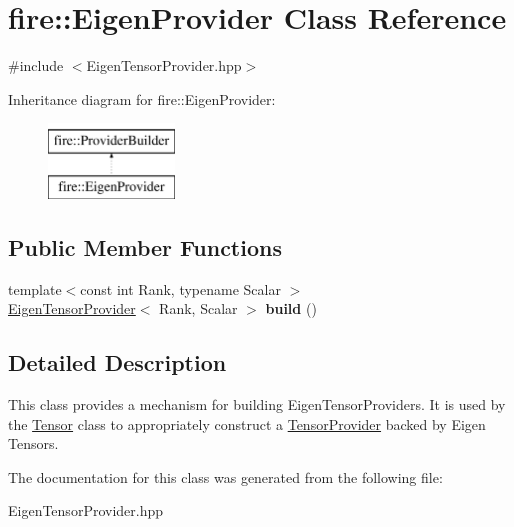 \hypertarget{a00834}{}\section{fire\+:\+:Eigen\+Provider Class Reference}
\label{a00834}


{\ttfamily \#include $<$Eigen\+Tensor\+Provider.\+hpp$>$}

Inheritance diagram for fire\+:\+:Eigen\+Provider\+:\begin{figure}[H]
\begin{center}
\leavevmode
\includegraphics[height=2.000000cm]{a00834}
\end{center}
\end{figure}
\subsection*{Public Member Functions}
\begin{DoxyCompactItemize}
\item 
\mbox{\label{a00834_ab9bfc7a0004ea10d57442f495c468b2e}} 
{\footnotesize template$<$const int Rank, typename Scalar $>$ }\\\hyperlink{a00830}{Eigen\+Tensor\+Provider}$<$ Rank, Scalar $>$ {\bfseries build} ()
\end{DoxyCompactItemize}


\subsection{Detailed Description}
This class provides a mechanism for building Eigen\+Tensor\+Providers. It is used by the \hyperlink{a00838}{Tensor} class to appropriately construct a \hyperlink{a00842}{Tensor\+Provider} backed by Eigen Tensors. 

The documentation for this class was generated from the following file\+:\begin{DoxyCompactItemize}
\item 
Eigen\+Tensor\+Provider.\+hpp\end{DoxyCompactItemize}
